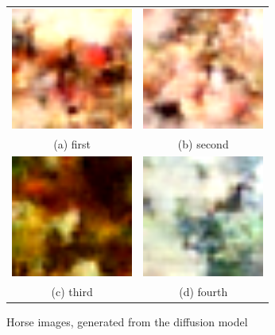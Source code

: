 \documentclass[conference]{IEEEtran}
\begin{document}
  \begin{figure}
    \begin{tabular}{cc}
      \includegraphics[width=40mm]{./images/generated-imgs-cosine/horse/0714.png} 
  &   \includegraphics[width=40mm]{./images/generated-imgs-cosine/horse/0715.png} 
  \\
    (a) first 
    & (b) second \\[6pt]
       \includegraphics[width=40mm]{./images/generated-imgs-cosine/horse/0716.png} 
    &  \includegraphics[width=40mm]{./images/generated-imgs-cosine/horse/0717.png} 
  \\
    (c) third & (d) fourth \\[6pt]
    \end{tabular}
    \caption{Horse images, generated from the diffusion model}
    \end{figure}
\end{document}
